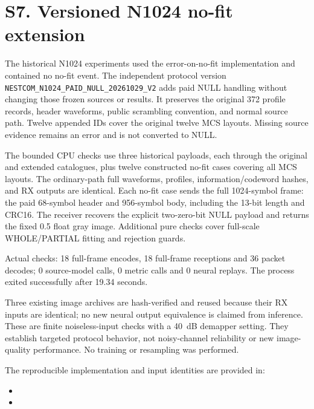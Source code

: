 \documentclass[11pt,letterpaper]{article}
\begin{document}
\clearpage\section*{S7. Versioned N1024 no-fit extension}
The historical N1024 experiments used the error-on-no-fit implementation and contained no no-fit event. The independent protocol version \texttt{NESTCOM\_N1024\_PAID\_NULL\_20261029\_V2} adds paid NULL handling without changing those frozen sources or results. It preserves the original 372 profile records, header waveforms, public scrambling convention, and normal source path. Twelve appended IDs cover the original twelve MCS layouts. Missing source evidence remains an error and is not converted to NULL.

The bounded CPU checks use three historical payloads, each through the original and extended catalogues, plus twelve constructed no-fit cases covering all MCS layouts. The ordinary-path full waveforms, profiles, information/codeword hashes, and RX outputs are identical. Each no-fit case sends the full 1024-symbol frame: the paid 68-symbol header and 956-symbol body, including the 13-bit length and CRC16. The receiver recovers the explicit two-zero-bit NULL payload and returns the fixed 0.5 float gray image. Additional pure checks cover full-scale WHOLE/PARTIAL fitting and rejection guards.

Actual checks: 18 full-frame encodes, 18 full-frame receptions and 36 packet decodes; 0 source-model calls, 0 metric calls and 0 neural replays. The process exited successfully after 19.34 seconds.

Three existing image archives are hash-verified and reused because their RX inputs are identical; no new neural output equivalence is claimed from inference. These are finite noiseless-input checks with a 40~dB demapper setting. They establish targeted protocol behavior, not noisy-channel reliability or new image-quality performance. No training or resampling was performed.

The reproducible implementation and input identities are provided in:
\begin{itemize}
\item {}
\item {}
\end{itemize}
\end{document}

